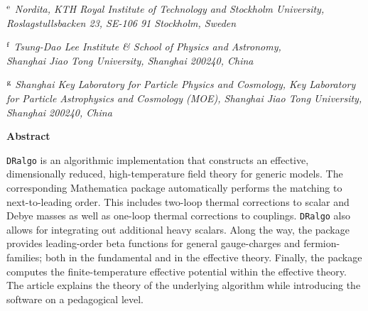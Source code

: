 \documentclass[11pt]{article}
\def\dralgo{{\tt DRalgo}}
\renewcommand{\rmi}[1]{{\mbox{\scriptsize #1}}}
\begin{document}
\begin{titlepage}
\begin{centering}
$^\rmi{e}$%
{\em
Nordita,
KTH Royal Institute of Technology and Stockholm University,\\
Roslagstullsbacken 23,
SE-106 91 Stockholm,
Sweden\\}
\vspace{0.3cm}

$^\rmi{f}$%
{\em
Tsung-Dao Lee Institute \& School of Physics and Astronomy,\\
Shanghai Jiao Tong University, Shanghai 200240, China\\}
\vspace{0.3cm}

$^\rmi{g}$%
{\em
Shanghai Key Laboratory for Particle Physics and Cosmology, Key Laboratory for Particle Astrophysics and Cosmology (MOE), Shanghai Jiao Tong University, Shanghai 200240, China\\}

\vspace*{0.8cm}

\mbox{\bf Abstract}

\end{centering}

\vspace*{0.3cm}

\noindent
% 
\dralgo{} is an algorithmic implementation 
that constructs an effective,
dimensionally reduced,
high-temperature field theory for generic models.
The corresponding Mathematica package automatically performs the matching to
next-to-leading order.
This includes
two-loop thermal corrections to scalar and Debye masses as well as 
one-loop thermal corrections to couplings.
\dralgo{} also allows for integrating out additional heavy scalars.
Along the way, the package provides
leading-order beta functions for general gauge-charges and fermion-families; both in
the fundamental and in the effective theory.
Finally, the package computes the finite-temperature effective potential within the effective theory.
The article explains the theory of the underlying algorithm
while introducing the software on a pedagogical level.

\vfill
\end{titlepage}

\tableofcontents
\renewcommand{\thefootnote}{\fnsymbol{footnote}}
\clearpage
\end{document}
